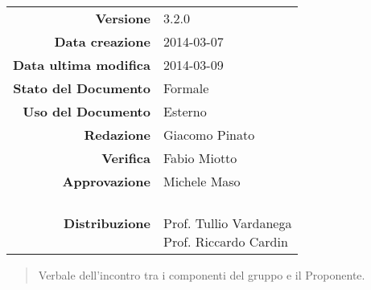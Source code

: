 
\newcommand{\Versione}{3.2.0}						%
\newcommand{\Data}{2014-03-07}						%
\newcommand{\DataUltimaModifica}{2014-03-09}
\newcommand{\TipoDocumento}{Verbale esterno 2014-03-05}		%




\begin{center}
\begin{tabular}{r|l}
\textbf{Versione} & \Versione{} \\
\textbf{Data creazione} & \Data{} \\
\textbf{Data ultima modifica} & \DataUltimaModifica{} \\
\textbf{Stato del Documento} & Formale \\		%
\textbf{Uso del Documento} & Esterno \\			%
\textbf{Redazione} & Giacomo Pinato\\				%
\textbf{Verifica} & Fabio Miotto\\		%
\textbf{Approvazione} & Michele Maso\\		%
\textbf{Distribuzione} & \parbox[t]{4cm}{\NomeGruppo{} \\Prof. Tullio Vardanega \\ Prof. Riccardo Cardin \\ \Prop{} }\\
\end{tabular}
\end{center}

\vspace{0.05in}

\begin{abstract}
\begin{center}
Verbale dell'incontro tra i componenti del gruppo \NomeGruppo{} e il Proponente.
\end{center}
\end{abstract}


